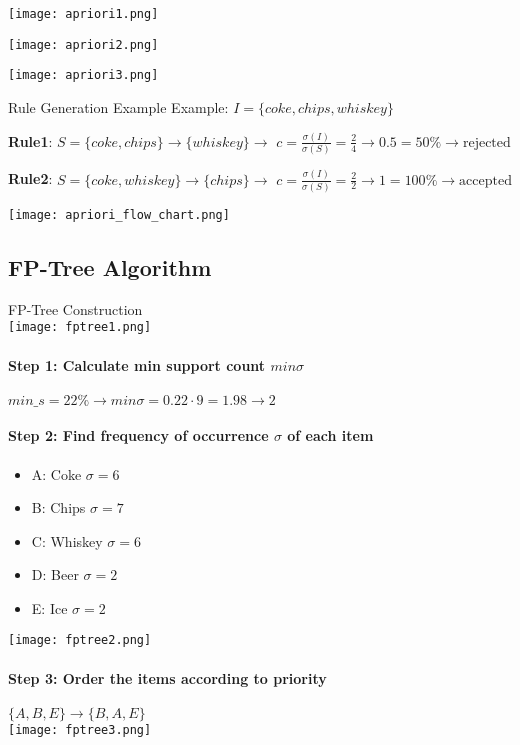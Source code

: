 \texttt{[image: apriori1.png]}

\texttt{[image: apriori2.png]}

\texttt{[image: apriori3.png]}

\multend

\begin{example2}{Rule Generation Example}
Example: $I = \{coke, chips, whiskey\}$

\textbf{Rule1}: $S = \{coke, chips\} \rightarrow \{whiskey\} \rightarrow$
$c = \frac{\sigma(I)}{\sigma(S)} = \frac{2}{4} \rightarrow 0.5 = 50\% \rightarrow \text{rejected}$

\textbf{Rule2}: $S = \{coke, whiskey\} \rightarrow \{chips\} \rightarrow$
$c = \frac{\sigma(I)}{\sigma(S)} = \frac{2}{2} \rightarrow 1 = 100\% \rightarrow \text{accepted}$
\end{example2}

\texttt{[image: apriori\_flow\_chart.png]}

\subsection{FP-Tree Algorithm}

\begin{KR}{FP-Tree Construction}\\
    \texttt{[image: fptree1.png]}

\paragraph{Step 1: Calculate min support count $min\sigma$}
$min\_s = 22\% \rightarrow min\sigma = 0.22 \cdot 9 = 1.98 \rightarrow 2$

\paragraph{Step 2: Find frequency of occurrence $\sigma$ of each item}
\begin{itemize}
    \item A: Coke $\sigma = 6$
    \item B: Chips $\sigma = 7$
    \item C: Whiskey $\sigma = 6$
    \item D: Beer $\sigma = 2$
    \item E: Ice $\sigma = 2$
\end{itemize}
\texttt{[image: fptree2.png]}

\paragraph{Step 3: Order the items according to priority}
$\{A, B, E\} \rightarrow \{B, A, E\}$\\
\texttt{[image: fptree3.png]}

\end{KR}

